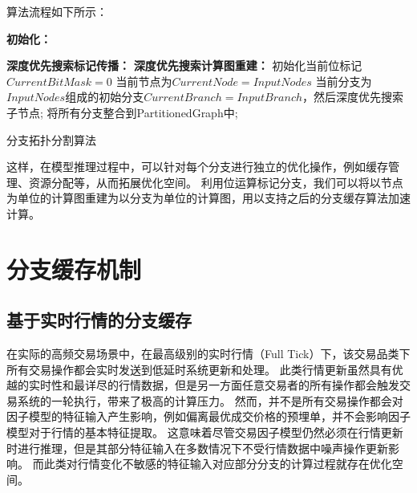算法流程如下所示：
\begin{algorithm}[h]
    \textbf{初始化：}\;
    
    \textbf{深度优先搜索标记传播：}\;
    \textbf{深度优先搜索计算图重建：}\;
    初始化当前位标记$CurrentBitMask = 0$\;
    当前节点为$CurrentNode = InputNodes$\;
    当前分支为$InputNodes$组成的初始分支$CurrentBranch = InputBranch$，然后深度优先搜索子节点;
    将所有分支整合到PartitionedGraph中;

    \caption{分支拓扑分割算法}
    \label{algo:branch_topology_partitioning}
\end{algorithm}

这样，在模型推理过程中，可以针对每个分支进行独立的优化操作，例如缓存管理、资源分配等，从而拓展优化空间。
利用位运算标记分支，我们可以将以节点为单位的计算图重建为以分支为单位的计算图，用以支持之后的分支缓存算法加速计算。

\section{分支缓存机制}

\subsection{基于实时行情的分支缓存}

在实际的高频交易场景中，在最高级别的实时行情（Full Tick）下，该交易品类下所有交易操作都会实时发送到低延时系统更新和处理。
此类行情更新虽然具有优越的实时性和最详尽的行情数据，但是另一方面任意交易者的所有操作都会触发交易系统的一轮执行，带来了极高的计算压力。
然而，并不是所有交易操作都会对因子模型的特征输入产生影响，例如偏离最优成交价格的预埋单，并不会影响因子模型对于行情的基本特征提取。
这意味着尽管交易因子模型仍然必须在行情更新时进行推理，但是其部分特征输入在多数情况下不受行情数据中噪声操作更新影响。
而此类对行情变化不敏感的特征输入对应部分分支的计算过程就存在优化空间。

